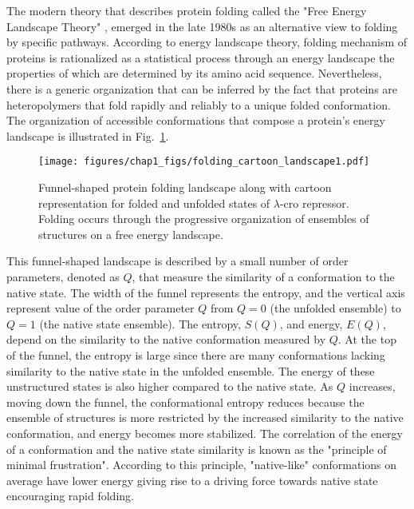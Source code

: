 \documentclass[../talant.diss.submit.tex]{subfiles}
\begin{document}
The modern theory that describes protein folding called the "Free Energy
Landscape Theory"
\cite{bryngelson:95,bryngelson:89,leopold:92p,brooks:01t,chan:98p,onuchic:97},
emerged in the late 1980s as an alternative view to folding by specific
pathways.  According to energy landscape theory, folding mechanism of proteins
is rationalized as a statistical process through an energy landscape
the properties of which are determined by its amino acid sequence. Nevertheless,
there is a generic organization that can be inferred by the fact that proteins
are heteropolymers that fold rapidly and reliably to a unique folded conformation.
The organization of accessible conformations that compose a protein's energy
landscape is 
illustrated in Fig.~\ref{fig:folding_cartoon_land}. 
%
%
\begin{figure}[htp!]
  \begin{centering}
    \texttt{[image: figures/chap1\_figs/folding\_cartoon\_landscape1.pdf]}
    \caption{Funnel-shaped protein folding landscape along with cartoon representation
      for folded and unfolded states of $\lambda$-cro repressor. Folding occurs through the
      progressive organization of ensembles of structures on a free energy landscape.}
    \label{fig:folding_cartoon_land}
  \end{centering}
\end{figure}
%
This funnel-shaped
landscape is described by a small number of order parameters, denoted as $Q$,
that measure the similarity of a conformation to the native state. The width of the funnel
represents the entropy, and the vertical axis represent value of the order parameter $Q$
from $Q=0$ (the unfolded ensemble) to $Q=1$ (the native state ensemble). The entropy, $S(Q)$, and
energy, $E(Q)$,  depend on the similarity to the native conformation measured by $Q$.
At the top of the funnel, the entropy is large since there are many
conformations lacking similarity to the native state in the unfolded ensemble.
The energy of these unstructured states is also higher compared to the native state.
As $Q$ increases, moving down the funnel,
the conformational entropy reduces
because the ensemble of structures is more restricted by the increased similarity to the native
conformation, and energy becomes more stabilized. The correlation of the energy
of a conformation and the native state similarity is known as the
"principle of minimal frustration".\cite{bryngelson:87,bryngelson:89}
According to this principle, "native-like" conformations on average have lower
energy giving rise to a driving force towards native state encouraging rapid
folding.
\end{document}
